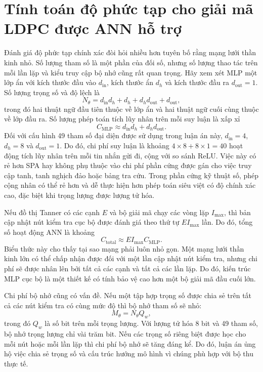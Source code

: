 \section{Tính toán độ phức tạp cho giải mã LDPC được ANN hỗ trợ}
Đánh giá độ phức tạp chính xác đòi hỏi nhiều hơn tuyên bố rằng mạng lưới thần kinh nhỏ. Số lượng tham số là một phần của đối số, nhưng số lượng thao tác trên mỗi lần lặp và kiểu truy cập bộ nhớ cũng rất quan trọng. Hãy xem xét MLP một lớp ẩn với kích thước đầu vào $d_{\mathrm{in}}$, kích thước ẩn $d_h$ và kích thước đầu ra $d_{\mathrm{out}}=1$. Số lượng trọng số và độ lệch là
\begin{equation}
  N_\theta=d_{\mathrm{in}}d_h+d_h+d_h d_{\mathrm{out}}+d_{\mathrm{out}},
\end{equation}
trong đó hai thuật ngữ đầu tiên thuộc về lớp ẩn và hai thuật ngữ cuối cùng thuộc về lớp đầu ra. Số lượng phép toán tích lũy nhân trên mỗi suy luận là xấp xỉ
\begin{equation}
  C_{\mathrm{MLP}}\approx d_{\mathrm{in}}d_h+d_h d_{\mathrm{out}}.
\end{equation}
Đối với cấu hình 49 tham số đại diện được sử dụng trong luận án này, $d_{\mathrm{in}}=4$, $d_h=8$ và $d_{\mathrm{out}}=1$. Do đó, chi phí suy luận là khoảng $4\times 8+8\times 1=40$ hoạt động tích lũy nhân trên mỗi tin nhắn gửi đi, cộng với so sánh ReLU. Việc này có rẻ hơn SPA hay không phụ thuộc vào chi phí phần cứng được gán cho việc truy cập tanh, tanh nghịch đảo hoặc bảng tra cứu. Trong phần cứng kỹ thuật số, phép cộng nhân có thể rẻ hơn và dễ thực hiện hơn phép toán siêu việt có độ chính xác cao, đặc biệt khi trọng lượng được lượng tử hóa.

Nếu đồ thị Tanner có các cạnh $E$ và bộ giải mã chạy các vòng lặp $I_{\max}$, thì bản cập nhật nút kiểm tra cục bộ được đánh giá theo thứ tự $E I_{\max}$ lần. Do đó, tổng số hoạt động ANN là khoảng
\begin{equation}
  C_{\mathrm{total}}\approx E I_{\max} C_{\mathrm{MLP}}.
\end{equation}
Biểu thức này cho thấy tại sao mạng phải luôn nhỏ gọn. Một mạng lưới thần kinh lớn có thể chấp nhận được đối với một lần cập nhật nút kiểm tra, nhưng chi phí sẽ được nhân lên bởi tất cả các cạnh và tất cả các lần lặp. Do đó, kiến ​​trúc MLP cục bộ là một thiết kế có tính bảo vệ cao hơn một bộ giải mã đầu cuối lớn.

Chi phí bộ nhớ cũng có vấn đề. Nếu một tập hợp trọng số được chia sẻ trên tất cả các nút kiểm tra có cùng mức độ thì bộ nhớ tham số sẽ nhỏ:
\begin{equation}
  M_{\theta}=N_{\theta}Q_w,
\end{equation}
trong đó $Q_w$ là số bit trên mỗi trọng lượng. Với lượng tử hóa 8 bit và 49 tham số, bộ nhớ trọng lượng chỉ vài trăm bit. Nếu các trọng số riêng biệt được học cho mỗi nút hoặc mỗi lần lặp thì chi phí bộ nhớ sẽ tăng đáng kể. Do đó, luận án ủng hộ việc chia sẻ trọng số và cấu trúc hướng mô hình vì chúng phù hợp với bộ thu thực tế.


